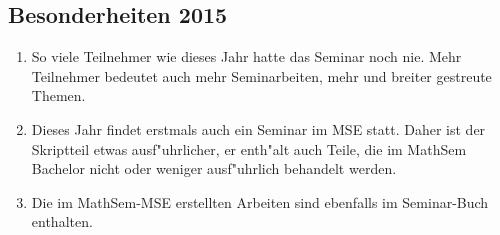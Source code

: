 \documentclass[a4paper]{article}
\begin{document}
\subsection{Besonderheiten 2015}
\begin{enumerate}
\item
So viele Teilnehmer wie dieses Jahr hatte das Seminar noch nie.
Mehr Teilnehmer bedeutet auch mehr Seminarbeiten, mehr und
breiter gestreute Themen.
\item
Dieses Jahr findet erstmals auch ein Seminar im MSE statt.
Daher ist der Skriptteil etwas ausf"uhrlicher, er enth"alt auch Teile,
die im MathSem Bachelor nicht oder weniger ausf"uhrlich behandelt werden.
\item
Die im MathSem-MSE erstellten Arbeiten sind ebenfalls im Seminar-Buch
enthalten.
\end{enumerate}
\end{document}
